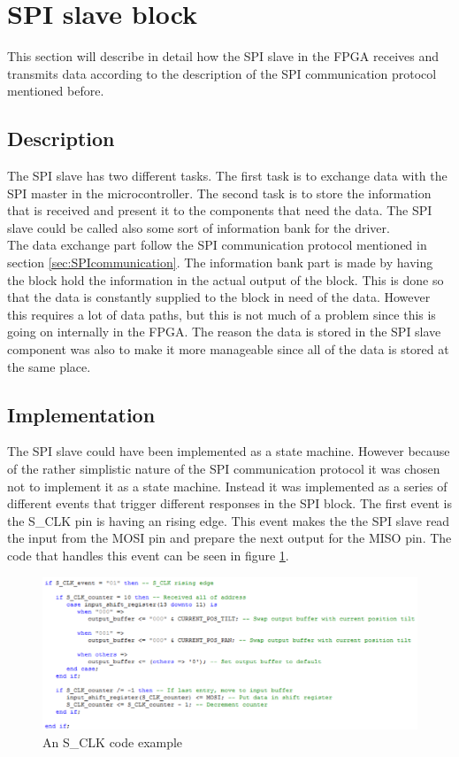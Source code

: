 \section{SPI slave block}
\label{sec:SPIslaveblock}
This section will describe in detail how the SPI slave in the FPGA receives and transmits data according to the description of the SPI communication protocol mentioned before.

\subsection{Description}

The SPI slave has two different tasks. The first task is to exchange data with the SPI master in the microcontroller. The second task is to store the information that is received and present it to the components that need the data. The SPI slave could be called also some sort of information bank for the driver.\\
The data exchange part follow the SPI communication protocol mentioned in section \ref{sec:SPIcommunication}.
The information bank part is made by having the block hold the information in the actual output of the block. This is done so that the data is constantly supplied to the block in need of the data. However this requires a lot of data paths, but this is not much of a problem since this is going on internally in the FPGA. The reason the data is stored in the SPI slave component was also to make it more manageable since all of the data is stored at the same place.

\subsection{Implementation}
\label{sec:Implementation}
The SPI slave could have been implemented as a state machine. However because of the rather simplistic nature of the SPI communication protocol it was chosen not to implement it as a state machine. Instead it was implemented as a series of different events that trigger different responses in the SPI block. The first event is the S\_CLK pin is having an rising edge. This event makes the the SPI slave read the input from the MOSI pin and prepare the next output for the MISO pin. The code that handles this event can be seen in figure \ref{fig:S_CLK_code_example}. 

\begin{figure}[h!]
\centering
\includegraphics[scale=0.5]{Billeder/FPGA/SPI_Slave/S_CLK_code_example.png}
\caption{ An S\_CLK code example }
\label{fig:S_CLK_code_example}
\end{figure}

